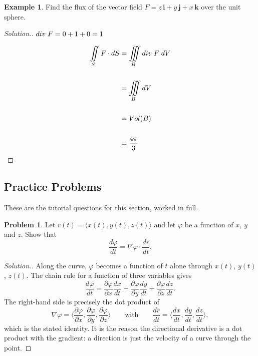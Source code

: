 \documentclass[11pt,a4paper]{article}
\theoremstyle{definition}
\newtheorem{exa}[thm]{Example}
\newtheorem{problemx}{Problem}[subsection]
\newenvironment{problem}{\begin{problemx}}{\end{problemx}}
\newenvironment{solution}
  {\renewcommand{\qedsymbol}{}\begin{proof}[\textit{Solution}.]}
  {\end{proof}}
\begin{document}
\begin{exa}


Find the flux of the vector field $F =z\,\textbf{i} + y\,\textbf{j} + x\,\textbf{k}$ over the unit sphere.
\end{exa}


\begin{solution}


$div\hspace{0.1cm} F = 0 + 1 + 0 = 1$

\begin{align*}
\iint\limits_S F\cdot dS & = \iiint\limits_Bdiv\hspace{0.1cm}F\hspace{0.1cm}dV\\\\
& = \iiint\limits_B dV\\\\
& = Vol(B)\\\\
& =\frac{4\pi}{3}\\
\end{align*}

\pagebreak
\end{solution}

\subsection{Practice Problems}

These are the tutorial questions for this section, worked in full.

\begin{problem}
Let $\overline{r}(t) = \langle x(t), y(t), z(t)\rangle$ and let $\varphi$ be a
function of $x$, $y$ and $z$. Show that
$$\frac{d\varphi}{dt} = \nabla\varphi\cdot\frac{d\overline{r}}{dt}.$$
\end{problem}
\begin{solution}
Along the curve, $\varphi$ becomes a function of $t$ alone through
$x(t)$, $y(t)$, $z(t)$. The chain rule for a function of three variables gives
$$\frac{d\varphi}{dt}
= \frac{\partial\varphi}{\partial x}\frac{dx}{dt}
+ \frac{\partial\varphi}{\partial y}\frac{dy}{dt}
+ \frac{\partial\varphi}{\partial z}\frac{dz}{dt}.$$
The right-hand side is precisely the dot product of
$$\nabla\varphi = \Big\langle \frac{\partial\varphi}{\partial x},
\frac{\partial\varphi}{\partial y},
\frac{\partial\varphi}{\partial z}\Big\rangle
\qquad\text{with}\qquad
\frac{d\overline{r}}{dt} = \Big\langle \frac{dx}{dt}, \frac{dy}{dt},
\frac{dz}{dt}\Big\rangle ,$$
which is the stated identity. It is the reason the directional derivative is a
dot product with the gradient: a direction is just the velocity of a curve
through the point.
\end{solution}
\end{document}

